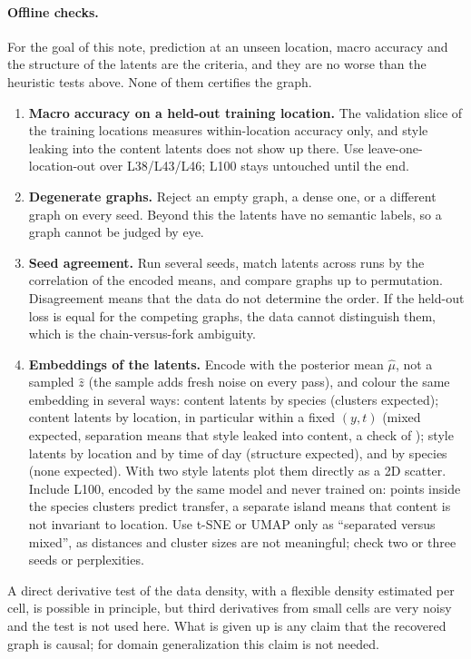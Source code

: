 \paragraph{Offline checks.}
For the goal of this note, prediction at an unseen location, macro accuracy and the structure of the
latents are the criteria, and they are no worse than the heuristic tests above. None of them 
certifies the graph.
\begin{enumerate}[label=(\arabic*),leftmargin=2em]
\item \textbf{Macro accuracy on a held-out training location.} The validation slice of the training
      locations measures within-location accuracy only, and style leaking into the content latents 
      does not show up there. Use leave-one-location-out over L38/L43/L46; L100 stays untouched 
      until the end.
\item \textbf{Degenerate graphs.} Reject an empty graph, a dense one, or a different graph on every 
      seed. Beyond this the latents have no semantic labels, so a graph cannot be judged by eye.
\item \textbf{Seed agreement.} Run several seeds, match latents across runs by the correlation of 
      the encoded means, and compare graphs up to permutation. Disagreement means that the data do 
      not determine the order. If the held-out loss is equal for the competing graphs, the data 
      cannot distinguish them, which is the chain-versus-fork ambiguity.
\item \textbf{Embeddings of the latents.} Encode with the posterior mean $\hat\mu$, not a sampled
      $\hat z$ (the sample adds fresh noise on every pass), and colour the same embedding in several 
      ways: content latents by species (clusters expected); content latents by location, in 
      particular within a fixed $(y,t)$ (mixed expected, separation means that style leaked into 
      content, a check of ); style latents by location and by time of day 
      (structure expected), and by species (none expected). With two style latents plot them 
      directly as a 2D scatter. Include L100, encoded by the same model and never trained on: points 
      inside the species clusters predict transfer, a separate island means that content is not 
      invariant to location. Use t-SNE or UMAP only as ``separated versus mixed'', as distances and 
      cluster sizes are not meaningful; check two or three seeds or perplexities.
\end{enumerate}
A direct derivative test of the data density, with a flexible density estimated per cell, is 
possible in principle, but third derivatives from small cells are very noisy and the test is not 
used here. What is given up is any claim that the recovered graph is causal; for domain 
generalization this claim is not needed.